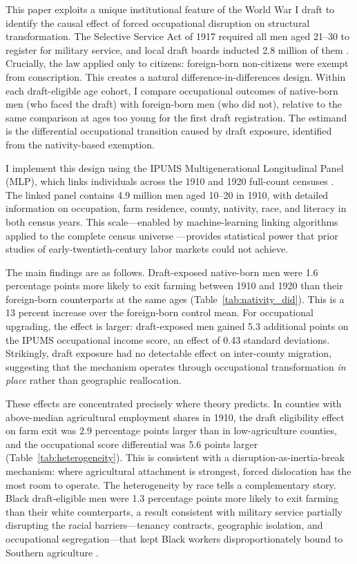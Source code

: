 \documentclass[12pt]{article}
\begin{document}
This paper exploits a unique institutional feature of the World War I draft to identify the causal effect of forced occupational disruption on structural transformation. The Selective Service Act of 1917 required all men aged 21--30 to register for military service, and local draft boards inducted 2.8 million of them \citep{kennedy2004}. Crucially, the law applied only to citizens: foreign-born non-citizens were exempt from conscription. This creates a natural difference-in-differences design. Within each draft-eligible age cohort, I compare occupational outcomes of native-born men (who faced the draft) with foreign-born men (who did not), relative to the same comparison at ages too young for the first draft registration. The estimand is the differential occupational transition caused by draft exposure, identified from the nativity-based exemption.

I implement this design using the IPUMS Multigenerational Longitudinal Panel (MLP), which links individuals across the 1910 and 1920 full-count censuses \citep{price2022, ruggles2020}. The linked panel contains 4.9 million men aged 10--20 in 1910, with detailed information on occupation, farm residence, county, nativity, race, and literacy in both census years. This scale---enabled by machine-learning linking algorithms applied to the complete census universe \citep{abramitzky2021}---provides statistical power that prior studies of early-twentieth-century labor markets could not achieve.

The main findings are as follows. Draft-exposed native-born men were 1.6 percentage points more likely to exit farming between 1910 and 1920 than their foreign-born counterparts at the same ages (Table~\ref{tab:nativity_did}). This is a 13 percent increase over the foreign-born control mean. For occupational upgrading, the effect is larger: draft-exposed men gained 5.3 additional points on the IPUMS occupational income score, an effect of 0.43 standard deviations. Strikingly, draft exposure had no detectable effect on inter-county migration, suggesting that the mechanism operates through occupational transformation \textit{in place} rather than geographic reallocation.

These effects are concentrated precisely where theory predicts. In counties with above-median agricultural employment shares in 1910, the draft eligibility effect on farm exit was 2.9 percentage points larger than in low-agriculture counties, and the occupational score differential was 5.6 points larger (Table~\ref{tab:heterogeneity}). This is consistent with a disruption-as-inertia-break mechanism: where agricultural attachment is strongest, forced dislocation has the most room to operate. The heterogeneity by race tells a complementary story. Black draft-eligible men were 1.3 percentage points more likely to exit farming than their white counterparts, a result consistent with military service partially disrupting the racial barriers---tenancy contracts, geographic isolation, and occupational segregation---that kept Black workers disproportionately bound to Southern agriculture \citep{collins2014, hornbeck2014}.
\end{document}
